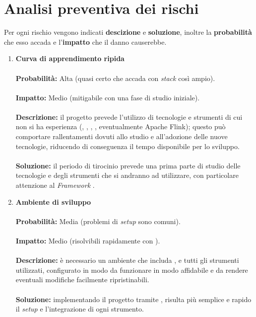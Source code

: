 \section{Analisi preventiva dei rischi}
Per ogni rischio vengono indicati \textbf{descizione} e \textbf{soluzione}, inoltre la \textbf{probabilità} che esso accada e l'\textbf{impatto} che il danno causerebbe. 
\begin{enumerate}
    \item \textbf{Curva di apprendimento ripida} \\ \\
        \textbf{Probabilità:} Alta (quasi certo che accada con \textit{stack} così ampio). \\ \\
        \textbf{Impatto:} Medio (mitigabile con una fase di studio iniziale). \\ \\
        \textbf{Descrizione:} il progetto prevede l'utilizzo di tecnologie e strumenti di cui non si ha esperienza (, , , , eventualmente Apache Flink); questo può comportare rallentamenti dovuti allo studio e all'adozione delle nuove tecnologie, riducendo di conseguenza il tempo disponibile per lo sviluppo. \\ \\
        \textbf{Soluzione:} il periodo di tirocinio prevede una prima parte di studio delle tecnologie e degli strumenti che si andranno ad utilizzare, con particolare attenzione al \textit{\gls{Framework}} .
    \item \textbf{Ambiente di sviluppo} \\ \\
        \textbf{Probabilità:} Media (problemi di \textit{setup} sono comuni). \\ \\
        \textbf{Impatto:} Medio (risolvibili rapidamente con ). \\ \\
        \textbf{Descrizione:} è necessario un ambiente che includa ,  e tutti gli strumenti utilizzati, configurato in modo da funzionare in modo affidabile e da rendere eventuali modifiche facilmente ripristinabili. \\ \\
        \textbf{Soluzione:} implementando il progetto tramite , risulta più semplice e rapido il \textit{setup} e l'integrazione di ogni strumento.

\end{enumerate}
